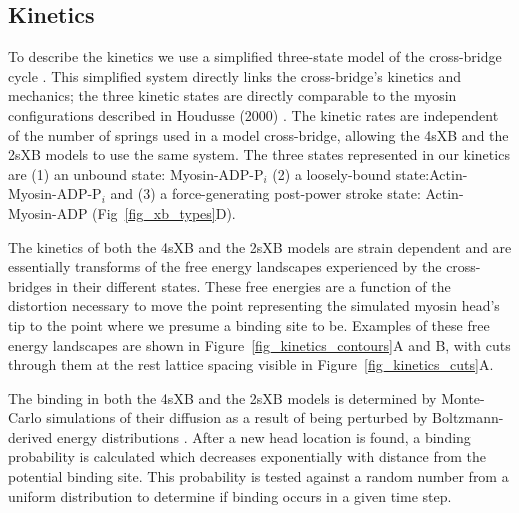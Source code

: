 \documentclass[10pt]{article}
\newcommand{\citep}[1]{\cite{#1}} %
\begin{document}
\subsection*{Kinetics} %

To describe the kinetics we use a simplified three-state model of the cross-bridge cycle \citep{Pate1989, Tanner2007}. 
This simplified system directly links the cross-bridge's kinetics and mechanics; the three kinetic states are directly comparable to the myosin configurations described in Houdusse (2000) \citep{Houdusse2000}. 
The kinetic rates are independent of the number of springs used in a model cross-bridge, allowing the 4sXB and the 2sXB models to use the same system. 
The three states represented in our kinetics are (1) an unbound state: Myosin-ADP-P$_i$ (2) a loosely-bound state:Actin-Myosin-ADP-P$_i$ and (3) a force-generating post-power stroke state: Actin-Myosin-ADP (Fig~\ref{fig_xb_types}D).

The kinetics of both the 4sXB and the 2sXB models are strain dependent and are essentially transforms of the free energy landscapes experienced by the cross-bridges in their different states.
These free energies are a function of the distortion necessary to move the point representing the simulated myosin head's tip to the point where we presume a binding site to be. 
Examples of these free energy landscapes are shown in Figure~\ref{fig_kinetics_contours}A and B, with cuts through them at the rest lattice spacing visible in Figure~\ref{fig_kinetics_cuts}A.

The binding in both the 4sXB and the 2sXB models is determined by Monte-Carlo simulations of their diffusion as a result of being perturbed by Boltzmann-derived energy distributions \citep{DillBook}. 
After a new head location is found, a binding probability is calculated which decreases exponentially with distance from the potential binding site. 
This probability is tested against a random number from a uniform distribution to determine if binding occurs in a given time step.
\end{document}

